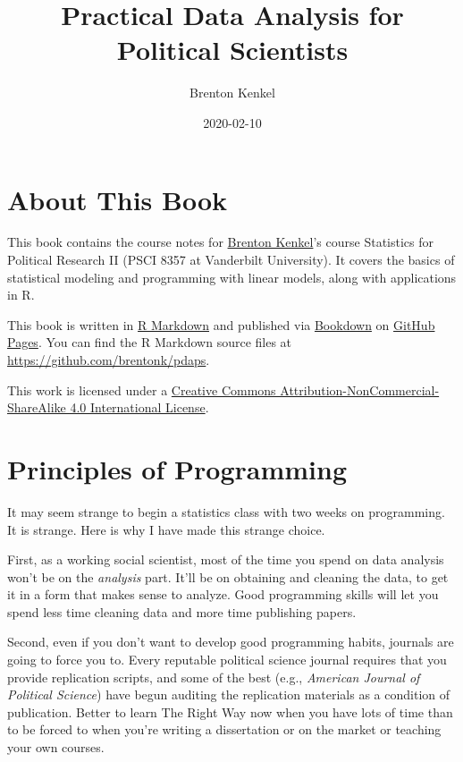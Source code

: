 \documentclass[12pt,oneside,openany]{book}
\title{Practical Data Analysis for Political Scientists}
\author{Brenton Kenkel}
\date{2020-02-10}
\begin{document}
\maketitle

{
\setcounter{tocdepth}{1}
\tableofcontents
}
\chapter{About This Book}\label{about-this-book}

This book contains the course notes for
\href{http://bkenkel.com}{Brenton Kenkel}'s course Statistics for
Political Research II (PSCI 8357 at Vanderbilt University). It covers
the basics of statistical modeling and programming with linear models,
along with applications in R.

This book is written in \href{http://rmarkdown.rstudio.com}{R Markdown}
and published via \href{https://bookdown.org}{Bookdown} on
\href{https://pages.github.com}{GitHub Pages}. You can find the R
Markdown source files at \url{https://github.com/brentonk/pdaps}.

This work is licensed under a
\href{http://creativecommons.org/licenses/by-nc-sa/4.0/}{Creative
Commons Attribution-NonCommercial-ShareAlike 4.0 International License}.

\hypertarget{programming}{\chapter{Principles of
Programming}\label{programming}}

It may seem strange to begin a statistics class with two weeks on
programming. It is strange. Here is why I have made this strange choice.

First, as a working social scientist, most of the time you spend on data
analysis won't be on the \emph{analysis} part. It'll be on obtaining and
cleaning the data, to get it in a form that makes sense to analyze. Good
programming skills will let you spend less time cleaning data and more
time publishing papers.

Second, even if you don't want to develop good programming habits,
journals are going to force you to. Every reputable political science
journal requires that you provide replication scripts, and some of the
best (e.g., \emph{American Journal of Political Science}) have begun
auditing the replication materials as a condition of publication. Better
to learn The Right Way now when you have lots of time than to be forced
to when you're writing a dissertation or on the market or teaching your
own courses.
\end{document}
